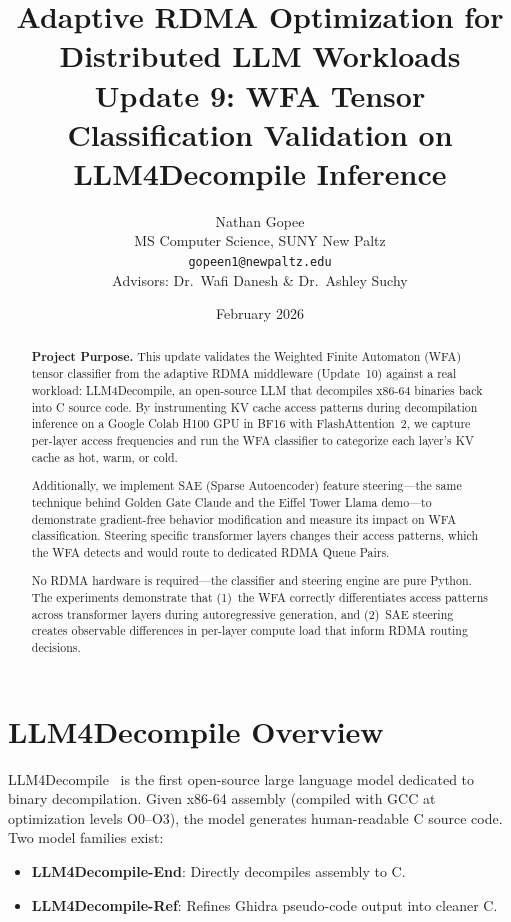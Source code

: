 \documentclass[11pt,letterpaper]{article}
\title{\textbf{Adaptive RDMA Optimization for Distributed LLM Workloads}\\[0.5em]
\large Update 9: WFA Tensor Classification Validation on LLM4Decompile Inference}
\author{Nathan Gopee\\
MS Computer Science, SUNY New Paltz\\
\texttt{gopeen1@newpaltz.edu}\\[1em]
\small Advisors: Dr.\ Wafi Danesh \& Dr.\ Ashley Suchy}
\date{February 2026}
\begin{document}
\maketitle

\begin{abstract}
\noindent
\textbf{Project Purpose.}
This update validates the Weighted Finite Automaton (WFA) tensor classifier from the adaptive RDMA middleware (Update~10) against a real workload: LLM4Decompile, an open-source LLM that decompiles x86-64 binaries back into C source code. By instrumenting KV cache access patterns during decompilation inference on a Google Colab H100 GPU in BF16 with FlashAttention~2, we capture per-layer access frequencies and run the WFA classifier to categorize each layer's KV cache as hot, warm, or cold.

Additionally, we implement SAE (Sparse Autoencoder) feature steering---the same technique behind Golden Gate Claude and the Eiffel Tower Llama demo---to demonstrate gradient-free behavior modification and measure its impact on WFA classification. Steering specific transformer layers changes their access patterns, which the WFA detects and would route to dedicated RDMA Queue Pairs.

No RDMA hardware is required---the classifier and steering engine are pure Python. The experiments demonstrate that (1)~the WFA correctly differentiates access patterns across transformer layers during autoregressive generation, and (2)~SAE steering creates observable differences in per-layer compute load that inform RDMA routing decisions.
\end{abstract}

\tableofcontents
\newpage

\section{LLM4Decompile Overview}
\label{sec:llm4decompile}

LLM4Decompile~\cite{llm4decompile} is the first open-source large language model dedicated to binary decompilation. Given x86-64 assembly (compiled with GCC at optimization levels O0--O3), the model generates human-readable C source code. Two model families exist:

\begin{itemize}
    \item \textbf{LLM4Decompile-End}: Directly decompiles assembly to C.
    \item \textbf{LLM4Decompile-Ref}: Refines Ghidra pseudo-code output into cleaner C.
\end{itemize}
\end{document}

